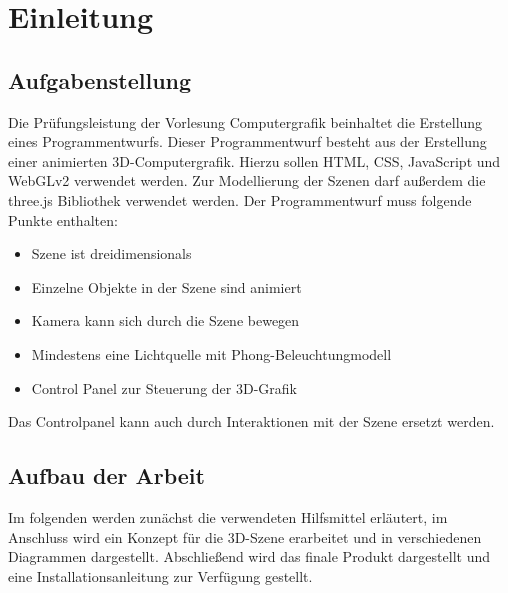 \section{Einleitung}
\subsection{Aufgabenstellung}
Die Prüfungsleistung der Vorlesung Computergrafik beinhaltet die Erstellung eines Programmentwurfs.
\newline
Dieser Programmentwurf besteht aus der Erstellung einer animierten 3D-Computergrafik.
Hierzu sollen HTML, CSS, JavaScript und WebGLv2 verwendet werden. Zur Modellierung der Szenen darf außerdem die three.js Bibliothek verwendet werden.
Der Programmentwurf muss folgende Punkte enthalten:
\begin{itemize}
\item Szene ist dreidimensionals
\item Einzelne Objekte in der Szene sind animiert
\item Kamera kann sich durch die Szene bewegen
\item Mindestens eine Lichtquelle mit Phong-Beleuchtungmodell
\item Control Panel zur Steuerung der 3D-Grafik
\end{itemize}
Das Controlpanel kann auch durch Interaktionen mit der Szene ersetzt werden.
\subsection{Aufbau der Arbeit}
Im folgenden werden zunächst die verwendeten Hilfsmittel erläutert,
im Anschluss wird ein Konzept für die 3D-Szene erarbeitet und in verschiedenen Diagrammen dargestellt.
Abschließend wird das finale Produkt dargestellt und eine Installationsanleitung zur Verfügung gestellt.
